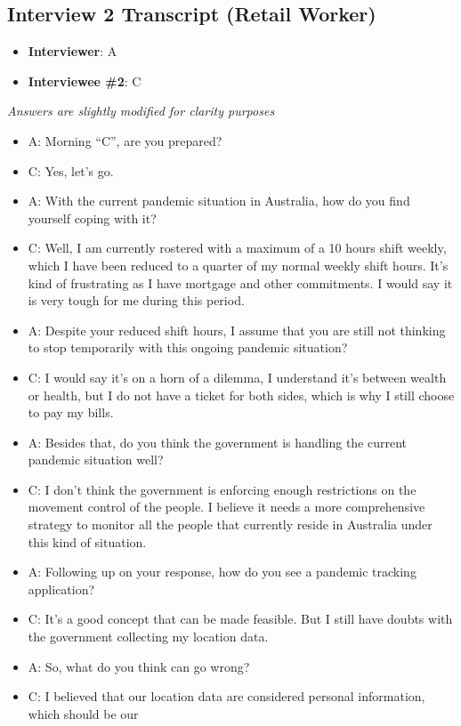   \subsection{Interview 2 Transcript (Retail Worker)}
  \begin{itemize}
    \item \textbf{Interviewer}: A
    \item \textbf{Interviewee \#2}: C
  \end{itemize}
  \par \textit{Answers are slightly modified for clarity purposes}

  \begin{itemize}
    \item A: Morning “C”, are you prepared?
    \item C: Yes, let’s go.
    \item A: With the current pandemic situation in Australia, how do you find yourself coping with it?
    \item C: Well, I am currently rostered with a maximum of a 10 hours shift weekly, which I have been
    reduced to a quarter of my normal weekly shift hours. It’s kind of frustrating as I have
    mortgage and other commitments. I would say it is very tough for me during this period.
    \item A: Despite your reduced shift hours, I assume that you are still not thinking to stop temporarily
    with this ongoing pandemic situation?
    \item C: I would say it’s on a horn of a dilemma, I understand it’s between wealth or health, but I do
    not have a ticket for both sides, which is why I still choose to pay my bills.
    \item A: Besides that, do you think the government is handling the current pandemic situation well?
    \item C: I don’t think the government is enforcing enough restrictions on the movement control of the
    people. I believe it needs a more comprehensive strategy to monitor all the people that
    currently reside in Australia under this kind of situation.
    \item A: Following up on your response, how do you see a pandemic tracking application?
    \item C: It’s a good concept that can be made feasible. But I still have doubts with the government
    collecting my location data.
    \item A: So, what do you think can go wrong?
    \item C: I believed that our location data are considered personal information, which should be our

\end{itemize}
